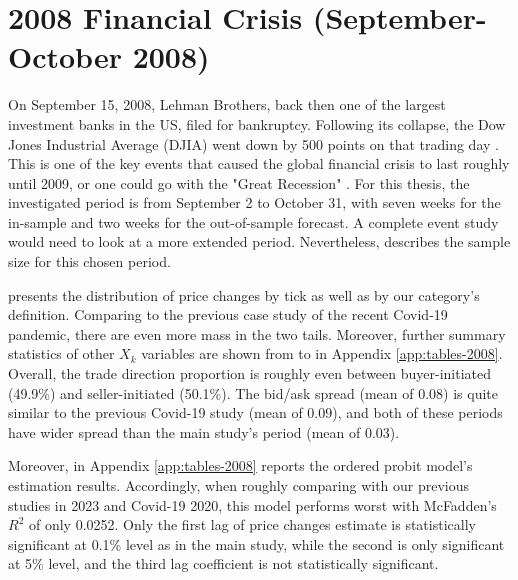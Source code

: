 \clearpage



\section{2008 Financial Crisis (September-October 2008)}

On September 15, 2008, Lehman Brothers, back then one of the largest investment banks in the US, filed for bankruptcy. Following its collapse, the Dow Jones Industrial Average (DJIA) went down by 500 points on that trading day \citep{johnson&mamun2012}. This is one of the key events that caused the global financial crisis to last roughly until 2009, or one could go with the "Great Recession" \citep{islam&verick2011}. For this thesis, the investigated period is from September 2 to October 31, with seven weeks for the in-sample and two weeks for the out-of-sample forecast. A complete event study would need to look at a more extended period. Nevertheless,  describes the sample size for this chosen period.

 presents the distribution of price changes by tick as well as by our category's definition. Comparing to the previous case study of the recent Covid-19 pandemic, there are even more mass in the two tails. Moreover, further summary statistics of other $X_k$ variables are shown from  to  in Appendix \ref{app:tables-2008}. Overall, the trade direction proportion is roughly even between buyer-initiated (49.9\%) and seller-initiated (50.1\%). The bid/ask spread (mean of 0.08) is quite similar to the previous Covid-19 study (mean of 0.09), and both of these periods have wider spread than the main study's period (mean of 0.03).

Moreover,  in Appendix \ref{app:tables-2008} reports the ordered probit model's estimation results. Accordingly, when roughly comparing with our previous studies in 2023 and Covid-19 2020, this model performs worst with McFadden's $R^2$ of only 0.0252. Only the first lag of price changes estimate is statistically significant at 0.1\% level as in the main study, while the second is only significant at 5\% level, and the third lag coefficient is not statistically significant.


